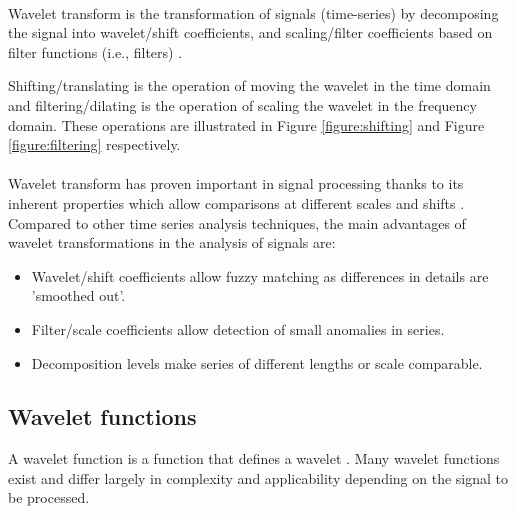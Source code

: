 \paragraph{}
Wavelet transform is the transformation of signals (time-series) by
decomposing the signal into wavelet/shift coefficients, and scaling/filter
coefficients based on filter functions (i.e., filters) \cite{karus2013}.

Shifting/translating is the operation of moving the wavelet in the time domain
and filtering/dilating is the operation of scaling the wavelet in the frequency
domain. These operations are illustrated in Figure \ref{figure:shifting} and
Figure \ref{figure:filtering} respectively.


\vspace{1em}


\paragraph{}
Wavelet transform has proven important in signal processing thanks to its
inherent properties which allow comparisons at different scales and shifts
\cite{karus2013}. Compared to other time series analysis techniques, the main
advantages of wavelet transformations in the analysis of signals are:
\begin{itemize}
	\item Wavelet/shift coefficients allow fuzzy matching as differences in details
	are 'smoothed out'.
	\item Filter/scale coefficients allow detection of small anomalies in series.
	\item Decomposition levels make series of different lengths or scale
	comparable.
\end{itemize}

\subsection{Wavelet functions}
A wavelet function is a function that defines a wavelet \cite{wadkar}. Many
wavelet functions exist and differ largely in complexity and applicability
depending on the signal to be processed.

